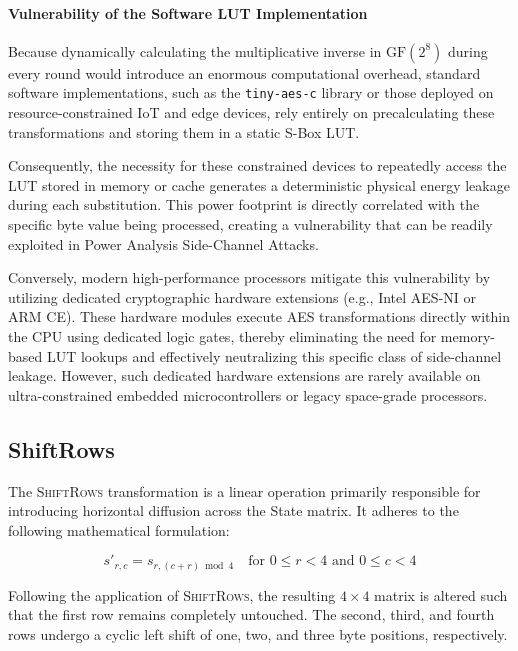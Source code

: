 \documentclass[11pt,a4paper]{report}
\begin{document}
\paragraph{Vulnerability of the Software LUT Implementation}
Because dynamically calculating the multiplicative inverse in $\mathrm{GF}(2^8)$ during every round would introduce an enormous computational overhead, 
standard software implementations, such as the \texttt{tiny-aes-c} library or those deployed on resource-constrained IoT and edge devices, 
rely entirely on precalculating these transformations and storing them in a static S-Box LUT.

Consequently, the necessity for these constrained devices to repeatedly access the LUT stored in memory or cache generates a deterministic physical energy leakage during each substitution. 
This power footprint is directly correlated with the specific byte value being processed, creating a vulnerability that can be readily exploited in Power Analysis Side-Channel Attacks.

Conversely, modern high-performance processors mitigate this vulnerability by utilizing dedicated cryptographic hardware extensions (e.g., Intel AES-NI or ARM CE). 
These hardware modules execute AES transformations directly within the CPU using dedicated logic gates, thereby eliminating the need for memory-based LUT lookups and effectively neutralizing this specific class of side-channel leakage.
However, such dedicated hardware extensions are rarely available on ultra-constrained embedded microcontrollers or legacy space-grade processors.

\subsection{ShiftRows}
The \textsc{ShiftRows} transformation is a linear operation primarily responsible for introducing horizontal diffusion across the State matrix. 
It adheres to the following mathematical formulation:

\begin{equation}
    s'_{r,c} = s_{r,(c+r) \bmod 4} \quad \text{for } 0 \le r < 4 \text{ and } 0 \le c < 4
    \label{eq:shift_rows}
\end{equation}

Following the application of \textsc{ShiftRows}, the resulting $4 \times 4$ matrix is altered such that the first row remains completely untouched. 
The second, third, and fourth rows undergo a cyclic left shift of one, two, and three byte positions, respectively. 
\end{document}
